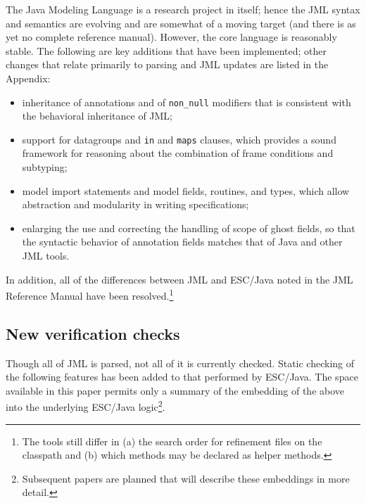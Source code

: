 \documentclass{llncs}
\begin{document}
The Java Modeling Language is a research project in itself; hence the
JML syntax and semantics are evolving and are somewhat of a moving
target (and there is as yet no complete reference manual).  However,
the core language is reasonably stable.  The following are key
additions that have been implemented; other changes that relate
primarily to parsing and JML updates are listed in the Appendix:

\setlength{\partopsep}{0in}\setlength{\parskip}{0in}\setlength{\itemsep}{0in}\setlength{\topsep}{0in}
\begin{itemize}
\setlength{\partopsep}{0in}\setlength{\parskip}{0in}\setlength{\itemsep}{0in}\setlength{\topsep}{0in}
\item inheritance of annotations and of \texttt{non\_null} modifiers
  that is consistent with the behavioral inheritance of JML;
\item support for datagroups and \texttt{in} and \texttt{maps}
  clauses, which provides a sound framework for reasoning about the
  combination of frame conditions and subtyping;
\item model import statements and model fields, routines, and types,
  which allow abstraction and modularity in writing specifications;
\item enlarging the use and correcting the handling of scope of ghost
  fields, so that the syntactic behavior of annotation fields matches
  that of Java and other JML tools.
\end{itemize}
In addition, all of the differences between JML and ESC/Java noted in
the JML Reference Manual have been resolved.\footnote{The tools still differ 
in (a) the search order for refinement files on the classpath and (b) which
methods may be declared as helper methods.}

\subsection{New verification checks}
Though all of JML is parsed, not all of it is currently checked.
Static checking of the following features has been added to that
performed by ESC/Java.  The space available in this paper permits only
a summary of the embedding of the above into the underlying ESC/Java
logic\footnote{Subsequent papers are planned that will describe these
  embeddings in more detail.}.

\end{document}
